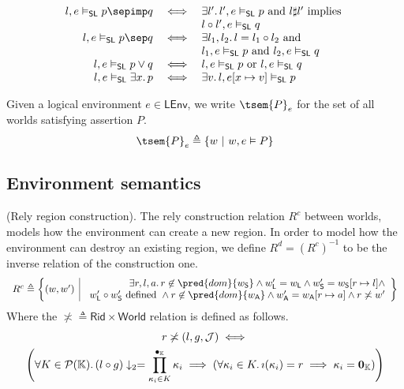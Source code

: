 \[\begin{array}{r c l}
	l, e \vDash_\mathsf{SL} p \sepimp q
	&
	\iff
	&
	\exists l' \ldotp l', e \vDash_\mathsf{SL} p \text{ and } l \sharp l' \text{ implies } \\
	&& l \circ l', e \vDash_\mathsf{SL} q
\\
	l, e \vDash_\mathsf{SL} p \sep q
	&
	\iff
	&
	\exists l_1, l_2 \ldotp l = l_1 \circ l_2 \text{ and } \\
	&& l_1, e \vDash_\mathsf{SL} p \text{ and } l_2, e \vDash_\mathsf{SL} q
\\
	 l, e \vDash_\mathsf{SL} p \lor q
	 &
	 \iff
	 &
	 l, e \vDash_\mathsf{SL} p \text{ or } l, e \vDash_\mathsf{SL} q
\\
	l, e \vDash_\mathsf{SL} \exists x \ldotp p
	&
	\iff
	&
	\exists v \ldotp l, e[x \mapsto v] \vDash_\mathsf{SL} p
\end{array}
\]
\endgroup

Given a logical environment $e \in \mathsf{LEnv}$, we write $\tsem{P}_e$ for the set of all worlds satisfying assertion $P$.
\[
	\tsem{P}_e \triangleq \{ w\ |\ w, e \vDash P \}
\]

\subsection{Environment semantics}

 (Rely region construction). The rely construction relation $R^c$ between worlds, models how the environment can create a new region. In order to model how the environment can destroy an existing region, we define $R^d = (R^c)^{-1}$ to be the inverse relation of the construction one.
\[
\begin{array}{r | l}
	R^c \triangleq \bigg\{ (w, w')
	&
	\begin{array}{r}
		\exists r, l, a \ldotp r \not\in \pred{dom}{w_\mathsf{S}} \land w'_\mathsf{L} = w_\mathsf{L} \land w'_\mathsf{S} = w_\mathsf{S}[r \mapsto l] \land
		\\
		w'_\mathsf{L} \circ w'_\mathsf{S} \text{ defined } \land r \not\in \pred{dom}{w_\mathsf{A}} \land w'_\mathsf{A} = w_\mathsf{A}[r \mapsto a] \land r \not\asymp w'
	\end{array}
	\bigg\}
\end{array}
\]
Where the $\not\asymp \triangleq \mathsf{Rid} \times \mathsf{World}$ relation is defined as follows.
\begin{gather*}
	r \not\asymp (l, g, \mathcal{J}) 
	\iff \\
	\left( \forall K \in \mathcal{P}(\mathbb{K}) \ldotp (l \circ g) \downarrow_2 = \prod_{\kappa_i \in K}^{\bullet_\mathbb{K}} \kappa_i \implies \left( \forall \kappa_i \in K \ldotp \imath(\kappa_i) = r \implies \kappa_i = \mathbf{0}_\mathbb{K} \right) \right)
\end{gather*}

